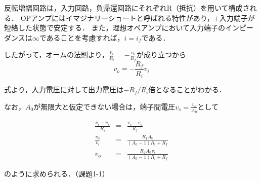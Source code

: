 \documentclass[dvipdfmx,titlepage,a4j]{jsarticle}  %
\begin{document}
反転増幅回路は，入力回路，負帰還回路にそれぞれR（抵抗）を用いて構成される．
OPアンプにはイマジナリーショートと呼ばれる特性があり，$\pm$入力端子が短絡した状態で安定する．
また，理想オペアンプにおいて入力端子のインピーダンスは$\infty$であることを考慮すれば，$i = i_f$である．

したがって，オームの法則より，$\frac{v_i}{R_i} = -\frac{v_0}{R_f}$が成り立つから
\begin{equation}
  v_{o} = -\frac{R_f}{R_i}v_i
\end{equation}

式より，入力電圧に対して出力電圧は$-R_f/R_i$倍となることがわかる．

なお，$A_0$が無限大と仮定できない場合は，端子間電圧$\displaystyle v_s = \frac{v_o}{A_0}$として

\begin{eqnarray}
    \frac{v_i - v_s}{R_i} &=& \frac{v_s - v_o}{R_f} \nonumber \\
    \frac{v_o}{v_i} &=& \frac{R_f A_0}{(A_0 - 1)R_i + R_f} \nonumber \\
    v_o &=& \frac{R_f A_0 v_i}{(A_0 - 1)R_i + R_f}
\end{eqnarray}

のように求められる．（課題1-1）
\end{document}
